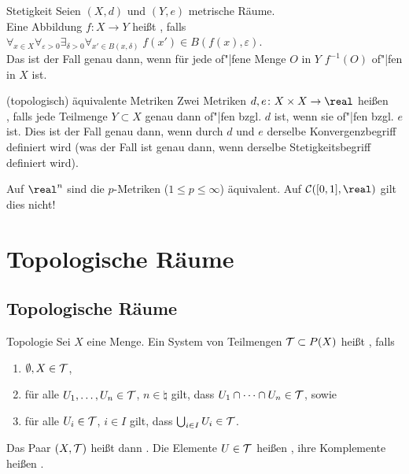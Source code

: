 \begin{Def}{Stetigkeit}
    Seien $(X, d)$ und $(Y, e)$ metrische Räume. \\
    Eine Abbildung $f\colon X \rightarrow Y$ heißt , falls
    $\forall_{x \in X} \forall_{\varepsilon > 0} \exists_{\delta > 0}
    \forall_{x' \in B(x, \delta)}\; f(x') \in B(f(x), \varepsilon)$. \\
    Das ist der Fall genau dann, wenn für jede of"|fene Menge $O$ in $Y$
    $f^{-1}(O)$ of"|fen in $X$ ist.
\end{Def}

\linie

\begin{Def}{(topologisch) äquivalente Metriken}
    Zwei Metriken $d, e\colon X \times X \rightarrow \real$ heißen \\
    , falls jede Teilmenge $Y \subset X$
    genau dann of"|fen bzgl. $d$ ist, wenn sie of"|fen bzgl. $e$ ist.
    Dies ist der Fall genau dann, wenn durch $d$ und $e$ derselbe
    Konvergenzbegriff definiert wird
    (was der Fall ist genau dann, wenn derselbe Stetigkeitsbegriff
    definiert wird).
\end{Def}

\begin{Bsp}
    Auf $\real^n$ sind die $p$-Metriken ($1 \le p \le \infty$) äquivalent.
    Auf $\C([0,1], \real)$ gilt dies nicht!
\end{Bsp}

\pagebreak

\section{%
    Topologische Räume%
}

\subsection{%
    Topologische Räume%
}

\begin{Def}{Topologie}
    Sei $X$ eine Menge.
    Ein System von Teilmengen $\mathcal{T} \subset P(X)$ heißt ,
    falls
    \begin{enumerate}[label=(O\arabic*)]
        \item
        $\emptyset, X \in \mathcal{T}$,

        \item
        für alle $U_1, \dotsc, U_n \in \mathcal{T}$, $n \in \natural$ gilt, dass
        $U_1 \cap \dotsb \cap U_n \in \mathcal{T}$, sowie

        \item
        für alle $U_i \in \mathcal{T}$, $i \in I$ gilt, dass
        $\bigcup_{i \in I} U_i \in \mathcal{T}$.
    \end{enumerate}
    Das Paar $(X, \mathcal{T})$ heißt dann .
    Die Elemente $U \in \mathcal{T}$ heißen ,
    ihre Komplemente heißen .
\end{Def}

